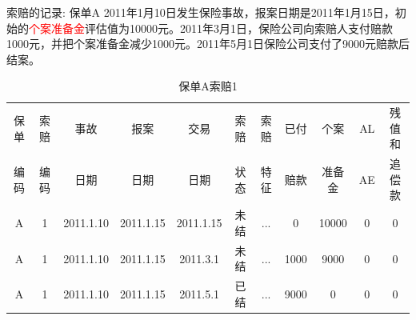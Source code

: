 \documentclass[professionalfont]{beamer}
\newcommand{\red}[1]{\textcolor{red}{#1}}
\begin{document}
\begin{frame}{索赔的记录: 保单A}
	2011年1月10日发生保险事故，报案日期是2011年1月15日，初始的\red{个案准备金}评估值为10000元。2011年3月1日，保险公司向索赔人支付赔款1000元，并把个案准备金减少1000元。2011年5月1日保险公司支付了9000元赔款后结案。
{\tiny\begin{table}[]
	\centering
	\caption{保单A索赔1}
	\label{my-label}
	\begin{tabular}{ccccccccccc}
		\hline
		保单 & 索赔 & 事故        & 报案        & 交易        & 索赔 & 索赔  & 已付   & 个案    & AL & 残值和 \\
		编码 & 编码 & 日期        & 日期        & 日期        & 状态 & 特征  & 赔款   & 准备金   &AE                       & 追偿款 \\ \hline
		A  & 1  & 2011.1.10 & 2011.1.15 & 2011.1.15 & 未结 & ... & 0    & 10000 & 0                     & 0   \\
		A  & 1  & 2011.1.10 & 2011.1.15 & 2011.3.1  & 未结 & ... & 1000 & 9000  & 0                     & 0   \\
		A  & 1  & 2011.1.10 & 2011.1.15 & 2011.5.1  & 已结 & ... & 9000 & 0     & 0                     & 0   \\ \hline
	\end{tabular}
\end{table}	}

~

\end{frame}
\end{document}
